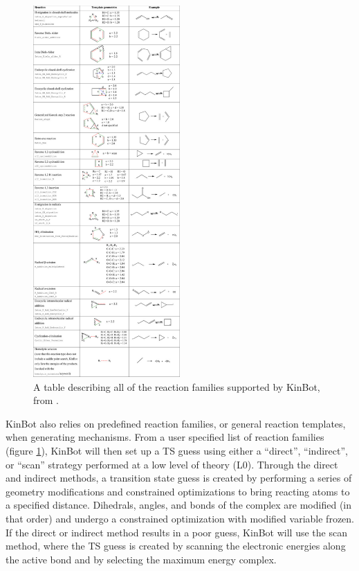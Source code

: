 \documentclass[preprint, 11pt]{elsarticle} %
\begin{document}
\begin{figure}
    \centering
    \includegraphics[width=0.5\textwidth]{kinbot_reactions}
    \caption{A table describing all of the reaction families supported by KinBot,  from \cite{kinbot:2019}.}
    \label{fig:kinbot_families}
\end{figure}

KinBot also relies on predefined reaction families, or general reaction templates, when generating mechanisms. 
From a user specified list of reaction families (figure \ref{fig:kinbot_families}), KinBot will then set up a TS guess using either a ``direct'', ``indirect'', or ``scan'' strategy performed at a low level of theory (L0).
Through the direct and indirect methods, a transition state guess is created by performing a series of geometry modifications and constrained optimizations to bring reacting atoms to a specified distance. 
Dihedrals, angles, and bonds of the complex are modified (in that order) and undergo a constrained optimization with modified variable frozen.
If the direct or indirect method results in a poor guess, KinBot will use the scan method, where the TS guess is created by scanning the electronic energies along the active bond and by selecting the maximum energy complex.
\end{document}

